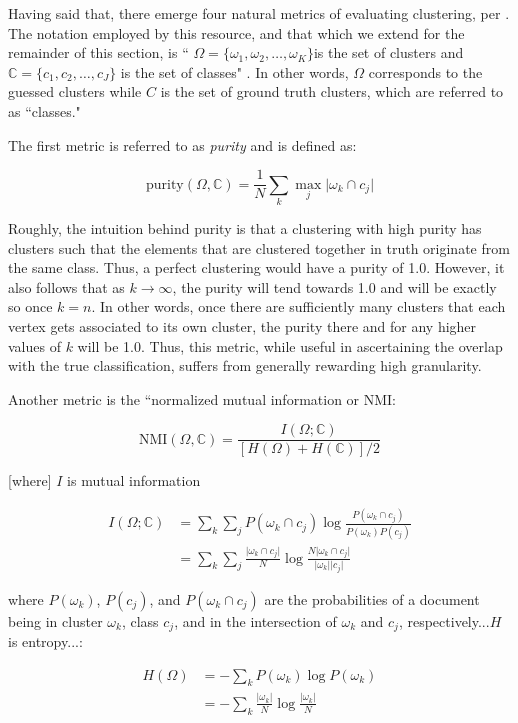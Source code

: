 \documentclass{article}
\begin{document}
Having said that, there emerge four natural metrics of evaluating clustering, per \cite{evaluation}. The notation employed by this resource, and that which we extend for the remainder of this section, is `` $\Omega = \{ \omega_1, \omega_2, \ldots, \omega_K \}$is the set of clusters and $\mathbb{C} = \{ c_1,c_2,\ldots,c_J \}$  is the set of classes" \cite{evaluation}. In other words, $\Omega$ corresponds to the guessed clusters while $C$ is the set of ground truth clusters, which are referred to as ``classes." 

The first metric is referred to as \textit{purity} and is defined as:

$$ \text{purity}( \Omega,\mathbb{C} ) = \frac{1}{N} \sum_k \max_j \vert\omega_k \cap c_j\vert $$

Roughly, the intuition behind purity is that a clustering with high purity has clusters such that the elements that are clustered together in truth originate from the same class. Thus, a perfect clustering would have a purity of 1.0. However, it also follows that as $k\rightarrow\infty$, the purity will tend towards 1.0 and will be exactly so once $k=n$. In other words, once there are sufficiently many clusters that each vertex gets associated to its own cluster, the purity there and for any higher values of $k$ will be 1.0. Thus, this metric, while useful in ascertaining the overlap with the true classification, suffers from generally rewarding high granularity. 

Another metric is the ``normalized mutual information or NMI:

$$ \text{NMI}(\Omega , \mathbb{C}) = \frac{ I(\Omega ; \mathbb{C}) } { [H(\Omega)+ H(\mathbb{C} )]/2 } $$

[where] $I$ is mutual information

\begin{align}
I( \Omega ; \mathbb{C} ) &= \sum_k \sum_j P(\omega_k \cap c_j) \log \frac{P(\omega_k \cap c_j)}{P(\omega_k)P(c_j)} \\
&= \sum_k \sum_j \frac{\vert\omega_k \cap c_j\vert}{N} \log \frac{N\vert\omega_k \cap c_j\vert}{\vert\omega_k\vert\vert c_j\vert}
\end{align}

where $P(\omega_k)$, $P(c_j)$, and $P(\omega_k \cap c_j)$ are the probabilities of a document being in cluster $\omega_k$, class $c_j$, and in the intersection of $\omega_k$ and $c_j$, respectively...$H$ is entropy...:

\begin{align}
H(\Omega) &= -\sum_k P(\omega_k) \log P(\omega_k) \\
&= -\sum_k \frac{\vert\omega_k\vert}{N} \log \frac{\vert\omega_k\vert}{N}
\end{align}
\end{document}
